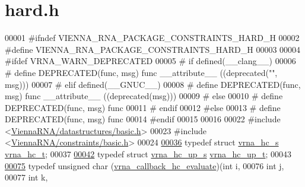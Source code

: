 \hypertarget{hard_8h_source}{}\section{hard.\+h}
\label{hard_8h_source}

\begin{DoxyCode}
00001 \textcolor{preprocessor}{#ifndef VIENNA\_RNA\_PACKAGE\_CONSTRAINTS\_HARD\_H}
00002 \textcolor{preprocessor}{#define VIENNA\_RNA\_PACKAGE\_CONSTRAINTS\_HARD\_H}
00003 
00004 \textcolor{preprocessor}{#ifdef VRNA\_WARN\_DEPRECATED}
00005 \textcolor{preprocessor}{# if defined(\_\_clang\_\_)}
00006 \textcolor{preprocessor}{#  define DEPRECATED(func, msg) func \_\_attribute\_\_ ((deprecated("", msg)))}
00007 \textcolor{preprocessor}{# elif defined(\_\_GNUC\_\_)}
00008 \textcolor{preprocessor}{#  define DEPRECATED(func, msg) func \_\_attribute\_\_ ((deprecated(msg)))}
00009 \textcolor{preprocessor}{# else}
00010 \textcolor{preprocessor}{#  define DEPRECATED(func, msg) func}
00011 \textcolor{preprocessor}{# endif}
00012 \textcolor{preprocessor}{#else}
00013 \textcolor{preprocessor}{# define DEPRECATED(func, msg) func}
00014 \textcolor{preprocessor}{#endif}
00015 
00016 
00022 \textcolor{preprocessor}{#include <\hyperlink{datastructures_2basic_8h}{ViennaRNA/datastructures/basic.h}>}
00023 \textcolor{preprocessor}{#include <\hyperlink{constraints_2basic_8h}{ViennaRNA/constraints/basic.h}>}
00024 
\hyperlink{group__hard__constraints_gac7e4c4f8abe3163a68110c5bff24e01d}{00036} \textcolor{keyword}{typedef} \textcolor{keyword}{struct  }\hyperlink{group__hard__constraints_structvrna__hc__s}{vrna\_hc\_s} \hyperlink{group__hard__constraints_structvrna__hc__s}{vrna\_hc\_t};
00037 
\hyperlink{group__hard__constraints_ga8cd53427a942a81c87ec526bbff32ef9}{00042} \textcolor{keyword}{typedef} \textcolor{keyword}{struct }\hyperlink{group__hard__constraints_structvrna__hc__up__s}{vrna\_hc\_up\_s} \hyperlink{group__hard__constraints_structvrna__hc__up__s}{vrna\_hc\_up\_t};
00043 
\hyperlink{group__hard__constraints_gae465f1d4a3d8b6592b38ecbb0d9f613d}{00075} \textcolor{keyword}{typedef} \textcolor{keywordtype}{unsigned} char (\hyperlink{group__hard__constraints_gae465f1d4a3d8b6592b38ecbb0d9f613d}{vrna\_callback\_hc\_evaluate})(\textcolor{keywordtype}{int}           i,
00076                                                   \textcolor{keywordtype}{int}           j,
00077                                                   \textcolor{keywordtype}{int}           k,

\end{DoxyCode}
